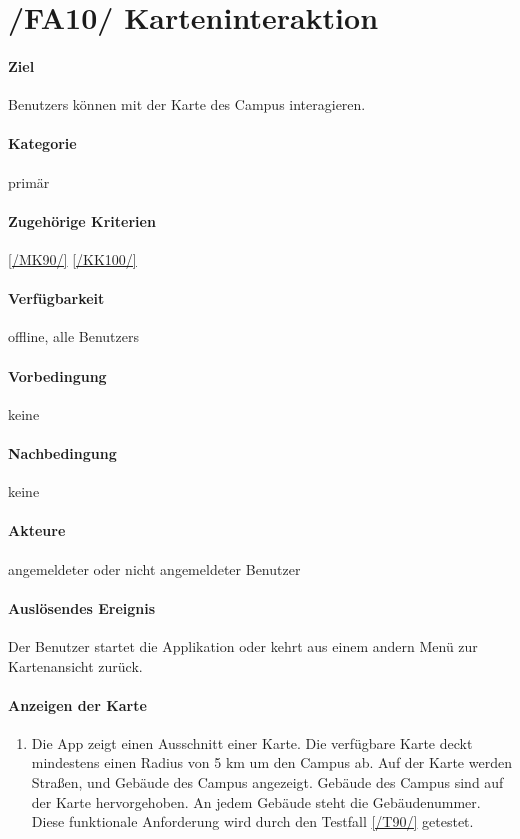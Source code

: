 \section[Karteninteraktion]{/FA10/ Karteninteraktion}
\label{/FA10/}
\paragraph{Ziel}
\Glspl{Benutzer} können mit der \Gls{Karte} des \Gls{Campus} interagieren.
\paragraph{Kategorie}
primär
\paragraph{Zugehörige Kriterien}
\ref{/MK90/} \ref{/KK100/}
\paragraph{Verfügbarkeit}
\gls{offline}, alle \Glspl{Benutzer}
\paragraph{Vorbedingung}
keine
\paragraph{Nachbedingung}
keine
\paragraph{Akteure}
angemeldeter oder nicht angemeldeter \Gls{Benutzer}
\paragraph{Auslösendes Ereignis}
Der \Gls{Benutzer} startet die Applikation oder kehrt aus einem andern Menü zur \Gls{Kartenansicht} zurück.
\paragraph{Anzeigen der Karte}
\begin{enumerate}[start=11, label=\textbf{/FA\arabic*/}, align=left]
    \item \label{/FA11/} Die App zeigt einen Ausschnitt einer \Gls{Karte}. Die verfügbare \Gls{Karte} deckt mindestens einen Radius von 5 km um den \Gls{Campus} ab. Auf der \Gls{Karte} werden Straßen, und Gebäude des \Gls{Campus} angezeigt. Gebäude des \Gls{Campus} sind auf der \Gls{Karte} hervorgehoben. An jedem Gebäude steht die Gebäudenummer. Diese funktionale Anforderung wird durch den Testfall \ref{/T90/} getestet.
\end{enumerate}
